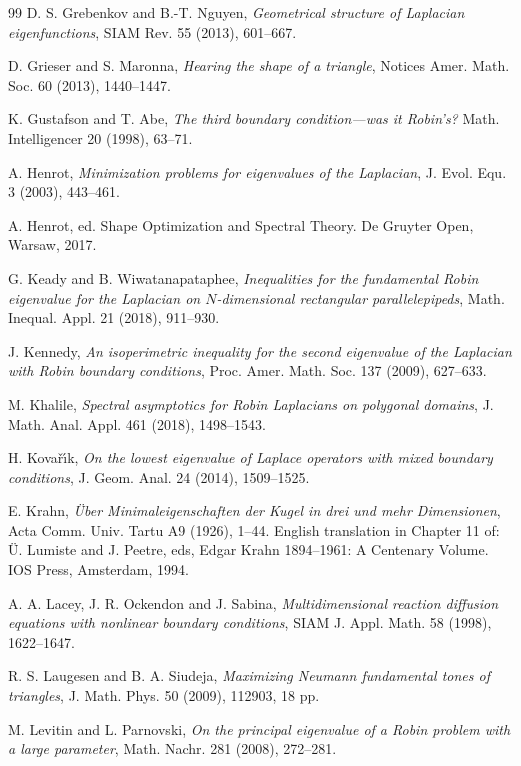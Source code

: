 \documentclass[12pt,reqno]{amsart}
\theoremstyle{definition}
\begin{document}
\begin{thebibliography}{99}
D. S. Grebenkov and B.-T. Nguyen, \emph{Geometrical structure of Laplacian eigenfunctions}, SIAM Rev. 55 (2013), 601--667.

D. Grieser and S. Maronna, \emph{Hearing the shape of a triangle}, Notices Amer. Math. Soc. 60 (2013), 1440--1447. 

K. Gustafson and T. Abe, \emph{The third boundary condition---was it Robin's?} Math. Intelligencer 20 (1998), 63--71. 

A. Henrot, \emph{Minimization problems for eigenvalues of the Laplacian}, J. Evol. Equ. 3 (2003), 443--461. 

A. Henrot, ed. Shape Optimization and Spectral Theory. De Gruyter Open, Warsaw, 2017.

G. Keady and B. Wiwatanapataphee, \emph{Inequalities for the fundamental Robin eigenvalue for the Laplacian on $N$-dimensional rectangular parallelepipeds}, Math. Inequal. Appl. 21 (2018), 911--930. 

J. Kennedy, \emph{An isoperimetric inequality for the second eigenvalue of the Laplacian with Robin boundary conditions}, Proc. Amer. Math. Soc. 137 (2009), 627--633. 

M. Khalile, \emph{Spectral asymptotics for Robin Laplacians on polygonal domains}, J. Math. Anal. Appl. 461 (2018), 1498--1543.

H. Kova\v{r}\'{\i}k, \emph{On the lowest eigenvalue of Laplace operators with mixed boundary conditions}, J. Geom. Anal. 24 (2014), 1509--1525.

E. Krahn, \emph{\"{U}ber Minimaleigenschaften der Kugel in drei und mehr Dimensionen}, Acta Comm. Univ. Tartu A9 (1926), 1--44. English translation in Chapter 11 of: \"{U}. Lumiste and J. Peetre, eds, Edgar Krahn 1894--1961: A Centenary Volume. IOS Press, Amsterdam, 1994. 

A. A. Lacey, J. R. Ockendon and J. Sabina, \emph{Multidimensional reaction diffusion equations with nonlinear boundary conditions}, SIAM J. Appl. Math. 58 (1998), 1622--1647. 

R. S. Laugesen and B. A. Siudeja, \emph{Maximizing Neumann fundamental tones of triangles}, J. Math. Phys. 50 (2009), 112903, 18 pp.

M. Levitin and L. Parnovski, \emph{On the principal eigenvalue of a Robin problem with a large parameter},  Math. Nachr. 281 (2008), 272--281. 


\end{thebibliography}
\end{document}
